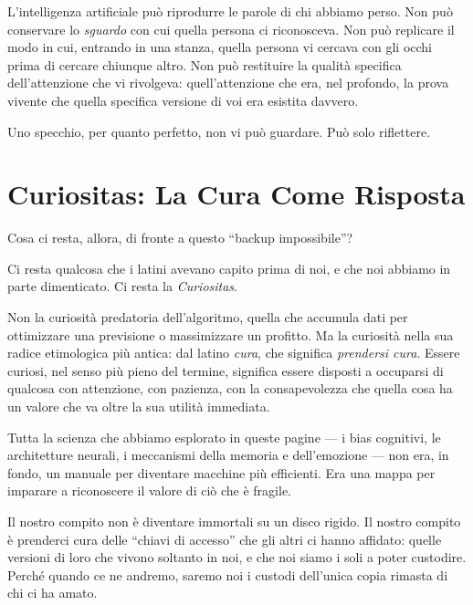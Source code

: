 L'intelligenza artificiale può riprodurre le parole di chi abbiamo perso. Non può conservare lo \emph{sguardo} con cui quella persona ci riconosceva. Non può replicare il modo in cui, entrando in una stanza, quella persona vi cercava con gli occhi prima di cercare chiunque altro. Non può restituire la qualità specifica dell'attenzione che vi rivolgeva: quell'attenzione che era, nel profondo, la prova vivente che quella specifica versione di voi era esistita davvero.

Uno specchio, per quanto perfetto, non vi può guardare. Può solo riflettere.

\begin{center}
	\label{fig:specchio_digitale}
\end{center}

\section{Curiositas: La Cura Come Risposta}

Cosa ci resta, allora, di fronte a questo ``backup impossibile''?

Ci resta qualcosa che i latini avevano capito prima di noi, e che noi abbiamo in parte dimenticato. Ci resta la \emph{Curiositas}.

Non la curiosità predatoria dell'algoritmo, quella che accumula dati per ottimizzare una previsione o massimizzare un profitto. Ma la curiosità nella sua radice etimologica più antica: dal latino \emph{cura}, che significa \emph{prendersi cura}. Essere curiosi, nel senso più pieno del termine, significa essere disposti a occuparsi di qualcosa con attenzione, con pazienza, con la consapevolezza che quella cosa ha un valore che va oltre la sua utilità immediata.

Tutta la scienza che abbiamo esplorato in queste pagine --- i bias cognitivi, le architetture neurali, i meccanismi della memoria e dell'emozione --- non era, in fondo, un manuale per diventare macchine più efficienti. Era una mappa per imparare a riconoscere il valore di ciò che è fragile.

Il nostro compito non è diventare immortali su un disco rigido. Il nostro compito è prenderci cura delle ``chiavi di accesso'' che gli altri ci hanno affidato: quelle versioni di loro che vivono soltanto in noi, e che noi siamo i soli a poter custodire. Perché quando ce ne andremo, saremo noi i custodi dell'unica copia rimasta di chi ci ha amato.

